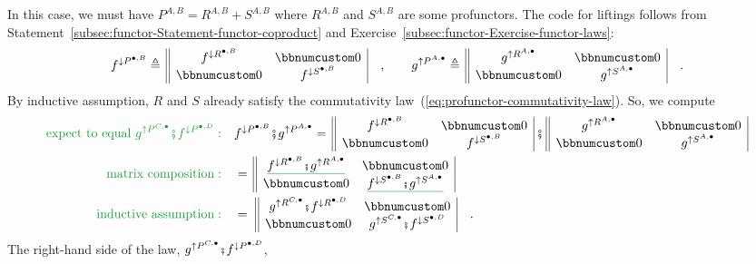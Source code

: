 In this case, we must have $P^{A,B}=R^{A,B}+S^{A,B}$ where $R^{A,B}$
and $S^{A,B}$ are some profunctors. The code for liftings follows
from Statement~\ref{subsec:functor-Statement-functor-coproduct}
and Exercise~\ref{subsec:functor-Exercise-functor-laws}:
\[
f^{\downarrow P^{\bullet,B}}\triangleq\,\begin{array}{||cc|}
f^{\downarrow R^{\bullet,B}} & \bbnum 0\\
\bbnum 0 & f^{\downarrow S^{\bullet,B}}
\end{array}\quad,\quad\quad g^{\uparrow P^{A,\bullet}}\triangleq\,\begin{array}{||cc|}
g^{\uparrow R^{A,\bullet}} & \bbnum 0\\
\bbnum 0 & g^{\uparrow S^{A,\bullet}}
\end{array}\quad.
\]
By inductive assumption, $R$ and $S$ already satisfy the commutativity
law~(\ref{eq:profunctor-commutativity-law}). So, we compute
\begin{align*}
{\color{greenunder}\text{expect to equal }g^{\uparrow P^{C,\bullet}}\bef f^{\downarrow P^{\bullet,D}}:}\quad & f^{\downarrow P^{\bullet,B}}\bef g^{\uparrow P^{A,\bullet}}=\,\begin{array}{||cc|}
f^{\downarrow R^{\bullet,B}} & \bbnum 0\\
\bbnum 0 & f^{\downarrow S^{\bullet,B}}
\end{array}\,\bef\,\begin{array}{||cc|}
g^{\uparrow R^{A,\bullet}} & \bbnum 0\\
\bbnum 0 & g^{\uparrow S^{A,\bullet}}
\end{array}\\
{\color{greenunder}\text{matrix composition}:}\quad & =\,\begin{array}{||cc|}
\gunderline{f^{\downarrow R^{\bullet,B}}\bef g^{\uparrow R^{A,\bullet}}} & \bbnum 0\\
\bbnum 0 & \gunderline{f^{\downarrow S^{\bullet,B}}\bef g^{\uparrow S^{A,\bullet}}}
\end{array}\\
{\color{greenunder}\text{inductive assumption}:}\quad & =\,\,\begin{array}{||cc|}
g^{\uparrow R^{C,\bullet}}\bef f^{\downarrow R^{\bullet,D}} & \bbnum 0\\
\bbnum 0 & g^{\uparrow S^{C,\bullet}}\bef f^{\downarrow S^{\bullet,D}}
\end{array}\quad.
\end{align*}
The right-hand side of the law, $g^{\uparrow P^{C,\bullet}}\bef f^{\downarrow P^{\bullet,D}}$,
